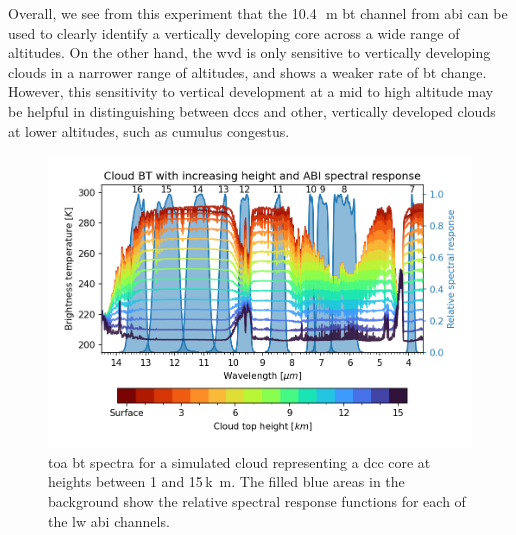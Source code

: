 Overall, we see from this experiment that the 10.4\,\unit{\mu m} \acrshort{bt} channel from \acrshort{abi} can be used to clearly identify a vertically developing core across a wide range of altitudes.
On the other hand, the \acrshort{wvd} is only sensitive to vertically developing clouds in a narrower range of altitudes, and shows a weaker rate of \acrshort{bt} change.
However, this sensitivity to vertical development at a mid to high altitude may be helpful in distinguishing between \acrshort{dcc}s and other, vertically developed clouds at lower altitudes, such as cumulus congestus.

\begin{figure}[t]
    \includegraphics[width=\textwidth]{figures/chapter1_05.png}
    \caption[
    \acrshort{toa} \acrshort{bt} spectra for a simulated cloud representing a \acrshort{dcc} core at heights between 1 and 15\,\unit{k m}
    ]{
    \acrshort{toa} \acrshort{bt} spectra for a simulated cloud representing a \acrshort{dcc} core at heights between 1 and 15\,\unit{k m}. The filled blue areas in the background show the relative spectral response functions for each of the \acrshort{lw} \acrshort{abi} channels.
    }
    \label{fig:cloud_height_spectra}
\end{figure}

